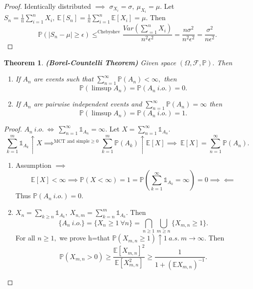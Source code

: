 \documentclass{article}
\newcommand{\1}{\mathds{1}}
\newcommand{\E}{\mathbb{E}}
\newcommand{\F}{\mathcal{F}}
\newcommand{\PB}{\mathbb{P}}
\newcommand{\lf}{\left}
\newcommand{\rg}{\right}
\newcommand{\f}[2]{\frac{#1}{#2}}
\newcommand{\contra}{\implies\impliedby}
\newcommand{\fb}[1]{\lf(#1\rg)}
\newcommand{\card}[1]{\lf\vert #1\rg\vert}
\newtheorem{theorem}{Theorem}[section]
\begin{document}
\begin{proof}
    Identically distributed $\implies$ $\sigma_{X_i}=\sigma,\ \mu_{X_i}=\mu.$ Let $S_n=\f 1n\sum_{i=1}^n X_i,\ \E[S_n]=\f 1n\sum_{i=1}^n \E[X_i]=\mu.$ Then $$\PB(\card{S_n-\mu}\geq \epsilon)\leq^{\text{Chebyshev}}\f{Var\fb{\sum_{=1}^n X_i}}{n^2\epsilon^2}=\f{n\sigma^2}{n^2\epsilon^2}=\f{\sigma^2}{n\epsilon^2}.$$
\end{proof}
\begin{theorem}\textbf{(Borel-Countelli Theorem)}
    Given space $(\Omega,\F,\PB).$ Then 
    \begin{enumerate}
        \item If $A_n$ are events such that $\sum_{n=1}^\infty \PB(A_n)<\infty,$ then $$\PB(\limsup A_n)=\PB(A_n\ i.o.)=0.$$
        \item If $A_n$ are pairwise independent events and $\sum_{n=1}^\infty\PB(A_n)=\infty$ then $$\PB(\limsup A_n)=\PB(A_n\ i.o.)=1.$$
    \end{enumerate}
\end{theorem}
\begin{proof}
    $A_n\ i.o.\ \iff\ \sum_{n=1}^\infty\1_{A_n}=\infty.$ Let $X=\sum_{n=1}^\infty \1_{A_n}.$ $$\sum_{k=1}^m\1_{A_k}\uparrow X\implies^{\text{MCT and simple}\geq 0} \sum_{k=1}^m\PB(A_k)\uparrow \E[X]\implies\ \E[X]=\sum_{n=1}^\infty \PB(A_n).$$ 
    \begin{enumerate}
        \item Assumption $\implies$ $$\E[X]<\infty\implies\PB(X<\infty)=1=\PB(\sum_{k=1}^\infty \1_{A_k}=\infty)=0\contra$$ Thus $\PB(A_n\ i.o.)=0$.
        \item $X_n=\sum_{k\geq n}\1_{A_k},\ X_{n,m}=\sum_{k=n}^m\1_{A_k}.$ Then $$\{A_n\ i.o.\}=\{X_n\geq 1\ \forall n\}=\bigcap_{n\geq 1}\bigcup_{m\geq n}\{X_{m,n}\geq 1\}.$$ For all $n\geq 1,$ we prove h=that $\PB(X_{m,n}\geq 1)\uparrow 1\ a.s.\ m\to\infty .$ Then $$\PB(X_{m,n}>0)\geq \f{\E [X_{m,n}]^2}{\E[X_{m,n}^2]}\geq \f 1{1+(\E X_{m,n})^{-1}}.$$
    \end{enumerate}
\end{proof}
\end{document}
